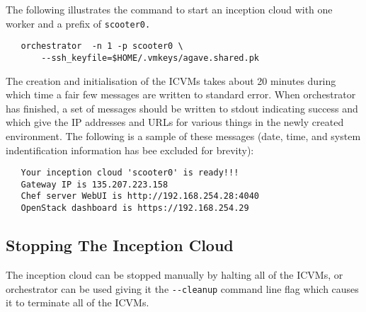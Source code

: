 \dlbeg{0.85in}

\vspace{5pt}

\vspace{5pt}

\vspace{5pt}

\vspace{5pt}
\dlend

\noindent
The following illustrates the command to start an inception cloud with one worker and a prefix of \verb!scooter0.!

\small\begin{verbatim}
   orchestrator  -n 1 -p scooter0 \
       --ssh_keyfile=$HOME/.vmkeys/agave.shared.pk
\end{verbatim}\normalsize
\noindent
The creation and initialisation of the ICVMs takes about 20 minutes during which time a fair few messages
are written to standard error. 
When orchestrator has finished, a set of messages should be written to stdout indicating success and which give the IP 
addresses and URLs for various things in the newly created environment.  
The following is a sample of these messages (date, time, and system indentification information has bee excluded for brevity):

\small\begin{verbatim}
   Your inception cloud 'scooter0' is ready!!!
   Gateway IP is 135.207.223.158
   Chef server WebUI is http://192.168.254.28:4040
   OpenStack dashboard is https://192.168.254.29
\end{verbatim}\normalsize

\subsection{Stopping The Inception Cloud}
The inception cloud can be stopped manually by halting all of the ICVMs, or orchestrator can be used
giving it the \verb!--cleanup! command line flag which causes it to terminate all of the ICVMs.

